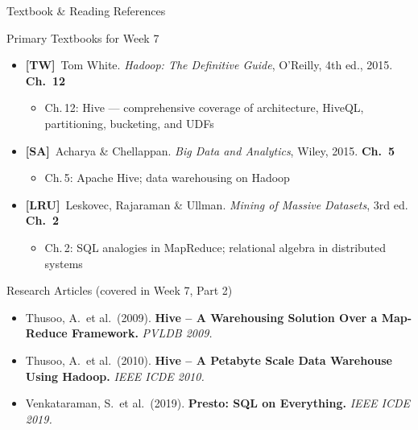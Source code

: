 \documentclass[aspectratio=169,10pt]{beamer}
\begin{document}
\begin{frame}{Textbook \& Reading References}
  \begin{block}{Primary Textbooks for Week 7}
    \begin{itemize}
      \item \textbf{[TW]}\ Tom White. \textit{Hadoop: The Definitive Guide}, O'Reilly, 4th ed., 2015.
            \hfill \textbf{Ch.\ 12}
            \begin{itemize}
              \small\item Ch.\,12: Hive — comprehensive coverage of architecture, HiveQL, partitioning, bucketing, and UDFs
            \end{itemize}
      \item \textbf{[SA]}\ Acharya \& Chellappan. \textit{Big Data and Analytics}, Wiley, 2015.
            \hfill \textbf{Ch.\ 5}
            \begin{itemize}
              \small\item Ch.\,5: Apache Hive; data warehousing on Hadoop
            \end{itemize}
      \item \textbf{[LRU]}\ Leskovec, Rajaraman \& Ullman. \textit{Mining of Massive Datasets}, 3rd ed.
            \hfill \textbf{Ch.\ 2}
            \begin{itemize}
              \small\item Ch.\,2: SQL analogies in MapReduce; relational algebra in distributed systems
            \end{itemize}
    \end{itemize}
  \end{block}
  \vspace{6pt}
  \begin{exampleblock}{Research Articles (covered in Week 7, Part 2)}
    \begin{itemize}
      \small
      \item Thusoo, A.\ et al.\ (2009). \textbf{Hive -- A Warehousing Solution Over a Map-Reduce Framework.}
            \textit{PVLDB 2009.}
      \item Thusoo, A.\ et al.\ (2010). \textbf{Hive -- A Petabyte Scale Data Warehouse Using Hadoop.}
            \textit{IEEE ICDE 2010.}
      \item Venkataraman, S.\ et al.\ (2019). \textbf{Presto: SQL on Everything.}
            \textit{IEEE ICDE 2019.}
    \end{itemize}
  \end{exampleblock}
\end{frame}
\end{document}
